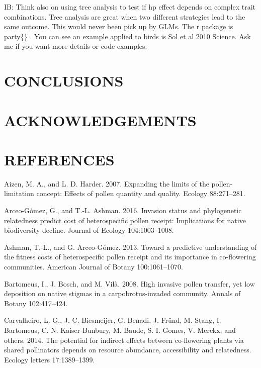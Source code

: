 \documentclass[11pt,a4paper]{article}
\begin{document}
IB: Think also on using tree analysis to test if hp effect depends on
complex trait combinations. Tree analysis are great when two different
strategies lead to the same outcome. This would never been pick up by
GLMs. The r package is party\{\} . You can see an example applied to
birds is Sol et al 2010 Science. Ask me if you want more details or code
examples.

\section{CONCLUSIONS}\label{conclusions}

\section{ACKNOWLEDGEMENTS}\label{acknowledgements}

\section{REFERENCES}\label{references}

\hypertarget{refs}{}
\hypertarget{ref-aizen2007}{}
Aizen, M. A., and L. D. Harder. 2007. Expanding the limits of the
pollen-limitation concept: Effects of pollen quantity and quality.
Ecology 88:271--281.

\hypertarget{ref-arceo2016}{}
Arceo-Gómez, G., and T.-L. Ashman. 2016. Invasion status and
phylogenetic relatedness predict cost of heterospecific pollen receipt:
Implications for native biodiversity decline. Journal of Ecology
104:1003--1008.

\hypertarget{ref-ashman2013}{}
Ashman, T.-L., and G. Arceo-Gómez. 2013. Toward a predictive
understanding of the fitness costs of heterospecific pollen receipt and
its importance in co-flowering communities. American Journal of Botany
100:1061--1070.

\hypertarget{ref-bartomeus2008}{}
Bartomeus, I., J. Bosch, and M. Vilà. 2008. High invasive pollen
transfer, yet low deposition on native stigmas in a carpobrotus-invaded
community. Annals of Botany 102:417--424.

\hypertarget{ref-carvalheiro2014}{}
Carvalheiro, L. G., J. C. Biesmeijer, G. Benadi, J. Fründ, M. Stang, I.
Bartomeus, C. N. Kaiser-Bunbury, M. Baude, S. I. Gomes, V. Merckx, and
others. 2014. The potential for indirect effects between co-flowering
plants via shared pollinators depends on resource abundance,
accessibility and relatedness. Ecology letters 17:1389--1399.
\end{document}
